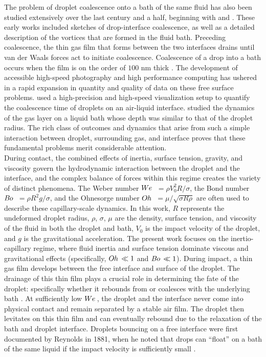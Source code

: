 \documentclass{jfm}
\begin{document}
\hspace*{1em} The problem of droplet coalescence onto a bath of the same fluid has also been studied extensively over the last century and a half, beginning with \cite{rayleigh1879capillary} and \cite{thomson1886v}.  These early works included sketches of drop-interface coalescence, as well as a detailed description of the vortices that are formed in the fluid bath. Preceding coalescence, the thin gas film that forms between the two interfaces drains until van der Waals forces act to initiate coalescence.  Coalescence of a drop into a bath occurs when the film is on the order of $100$ nm thick \citep{couder2005bouncing,yarin2006drop,de2012dynamics,kavehpour2015coalescence}. The development of accessible high-speed photography and high performance computing has ushered in a rapid expansion in quantity and quality of data on these free surface problems. \cite{thoroddsen2000coalescence} used a high-precision and high-speed visualization setup to quantify the coalescence time of droplets on an air-liquid interface. \cite{tang2019bouncing} studied the dynamics of the gas layer on a liquid bath whose depth was similar to that of the droplet radius. The rich class of outcomes and dynamics that arise from such a simple interaction between droplet, surrounding gas, and interface proves that these fundamental problems merit considerable attention. \\
\hspace*{1em} During contact, the combined effects of inertia, surface tension, gravity, and viscosity govern the hydrodynamic interaction between the droplet and the interface, and the complex balance of forces within this regime creates the variety of distinct phenomena. The Weber number $W\kern-0.03em e\,$ $= \rho V_0^2 R /\sigma$, the Bond number $B\kern-0.04em o\,$ $= \rho R^2 g/\sigma$, and the Ohnesorge number $O\kern-0.04em h\,$ $= \mu/\sqrt{\sigma R \rho}$ are often used to describe these capillary-scale dynamics. In this work, $R$ represents the undeformed droplet radius, $\rho$, $\sigma$, $\mu$ are the density, surface tension, and viscosity of the fluid in both the droplet and bath, $V_0$ is the impact velocity of the droplet, and $g$ is the gravitational acceleration.  The present work focuses on the inertio-capillary regime, where fluid inertia and surface tension dominate viscous and gravitational effects (specifically, $O\kern-0.04em h\,\ll1$ and $B\kern-0.04em o\,\ll1$).  During impact, a thin gas film develops between the free interface and surface of the droplet. The drainage of this thin film plays a crucial role in determining the fate of the droplet: specifically whether it rebounds from or coalesces with the underlying bath \citep{de2012dynamics}.  At sufficiently low $W\kern-0.03em e\,$, the droplet and the interface never come into physical contact and remain separated by a stable air film. The droplet then levitates on this thin film and can eventually rebound due to the relaxation of the bath and droplet interface. Droplets bouncing on a free interface were first documented by Reynolds in 1881, when he noted that drops can ``float'' on a bath of the same liquid if the impact velocity is sufficiently small \citep{reynolds1881drops}. \\ 
\end{document}
